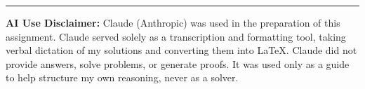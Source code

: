\documentclass[12 pt]{article}
\newtheorem{prob}{Problem}
\begin{document}
\vspace{1em}
\hrule
\vspace{1em}









\noindent\textbf{AI Use Disclaimer:} Claude (Anthropic) was used in the preparation of this assignment. Claude served solely as a transcription and formatting tool, taking verbal dictation of my solutions and converting them into \LaTeX. Claude did not provide answers, solve problems, or generate proofs. It was used only as a guide to help structure my own reasoning, never as a solver.
\end{document}
